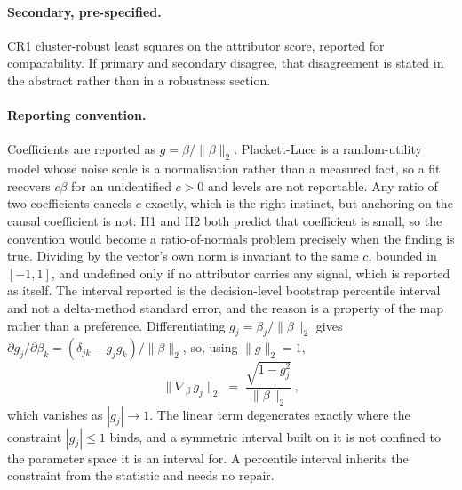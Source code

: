 \documentclass[11pt]{article}
\theoremstyle{remark}
\begin{document}
\paragraph{Secondary, pre-specified.} CR1 cluster-robust least squares on the
attributor score, reported for comparability. If primary and secondary disagree,
that disagreement is stated in the abstract rather than in a robustness section.

\paragraph{Reporting convention.} Coefficients are reported as
$g = \beta / \lVert \beta \rVert_2$. Plackett-Luce is a random-utility model whose
noise scale is a normalisation rather than a measured fact, so a fit recovers
$c\beta$ for an unidentified $c > 0$ and levels are not reportable. Any ratio of
two coefficients cancels $c$ exactly, which is the right instinct, but anchoring
on the causal coefficient is not: H1 and H2 both predict that coefficient is
small, so the convention would become a ratio-of-normals problem
\citep{fieller1954} precisely when the finding is true. Dividing by the vector's
own norm is invariant to the same $c$, bounded in $[-1,1]$, and undefined only
if no attributor carries any signal, which is reported as itself. The interval
reported is the decision-level bootstrap percentile interval and not a
delta-method standard error, and the reason is a property of the map rather than
a preference. Differentiating $g_j = \beta_j / \lVert \beta \rVert_2$ gives
$\partial g_j / \partial \beta_k = (\delta_{jk} - g_j g_k) / \lVert \beta \rVert_2$,
so, using $\lVert g \rVert_2 = 1$,
\[
  \bigl\lVert \nabla_{\beta}\, g_j \bigr\rVert_2
  \;=\; \frac{\sqrt{1 - g_j^2}}{\lVert \beta \rVert_2} \,,
\]
which vanishes as $|g_j| \to 1$. The linear term degenerates exactly where the
constraint $|g_j| \le 1$ binds, and a symmetric interval built on it is not
confined to the parameter space it is an interval for. A percentile interval
inherits the constraint from the statistic and needs no repair.
\end{document}
